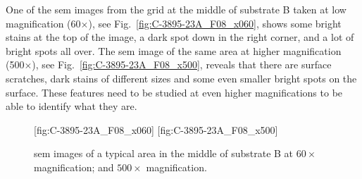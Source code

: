 



One of the \ac{sem} images from the grid at the middle of substrate B taken at low magnification (60$\times$), see Fig.~\ref{fig:C-3895-23A_F08_x060}, shows some bright stains at the top of the image, a dark spot down in the right corner, and a lot of bright spots all over. The \ac{sem} image of the same area at higher magnification (500$\times$), see Fig.~\ref{fig:C-3895-23A_F08_x500}, reveals that there are surface scratches, dark stains of different sizes and some even smaller bright spots on the surface. These features need to be studied at even higher magnifications to be able to identify what they are.

\begin{figure}[htbp]
    \centering
    [fig:C-3895-23A_F08_x060]
    \hfill
    [fig:C-3895-23A_F08_x500]
    \caption[\Ac{sem} images of a typical area in the middle of substrate B.]{\Acf{sem} images of a typical area in the middle of substrate B at  $60\times$ magnification; and  $500\times$ magnification.}
    \label{fig:SEM_C389523_overview}
\end{figure}


